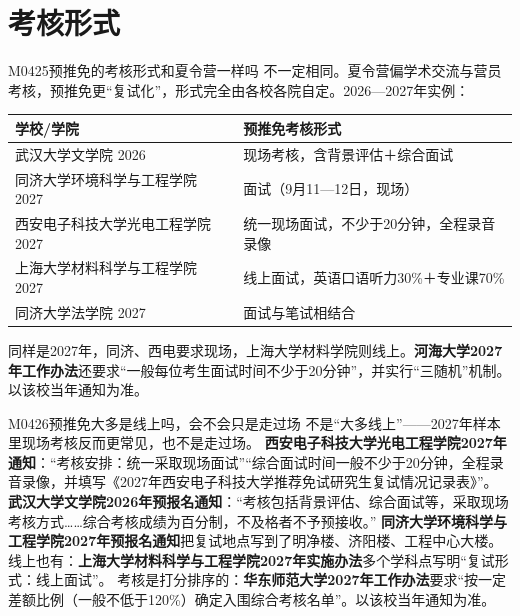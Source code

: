 \section{考核形式}
\begin{qa}{M0425}{预推免的考核形式和夏令营一样吗}
不一定相同。夏令营偏学术交流与营员考核，预推免更“复试化”，形式完全由各校各院自定。2026—2027年实例：
\par\vspace{2pt}\nobreak\begin{center}\footnotesize
\begin{tabularx}{\textwidth}{>{\raggedright\arraybackslash}X>{\raggedright\arraybackslash}X}
\toprule
\textbf{学校/学院} & \textbf{预推免考核形式} \\ \midrule
武汉大学文学院 2026 & 现场考核，含背景评估＋综合面试 \\
同济大学环境科学与工程学院 2027 & 面试（9月11—12日，现场） \\
西安电子科技大学光电工程学院 2027 & 统一现场面试，不少于20分钟，全程录音录像 \\
上海大学材料科学与工程学院 2027 & 线上面试，英语口语听力30\%＋专业课70\% \\
同济大学法学院 2027 & 面试与笔试相结合 \\
\bottomrule
\end{tabularx}
\end{center}\vspace{2pt}\par
同样是2027年，同济、西电要求现场，上海大学材料学院则线上。\textbf{河海大学2027年工作办法}还要求“一般每位考生面试时间不少于20分钟”，并实行“三随机”机制。以该校当年通知为准。
\end{qa}

\begin{qa}{M0426}{预推免大多是线上吗，会不会只是走过场}
不是“大多线上”——2027年样本里现场考核反而更常见，也不是走过场。
\textbf{西安电子科技大学光电工程学院2027年通知}：“考核安排：统一采取现场面试”“综合面试时间一般不少于20分钟，全程录音录像，并填写《2027年西安电子科技大学推荐免试研究生复试情况记录表》”。
\textbf{武汉大学文学院2026年预报名通知}：“考核包括背景评估、综合面试等，采取现场考核方式……综合考核成绩为百分制，不及格者不予预接收。”
\textbf{同济大学环境科学与工程学院2027年预报名通知}把复试地点写到了明净楼、济阳楼、工程中心大楼。
线上也有：\textbf{上海大学材料科学与工程学院2027年实施办法}多个学科点写明“复试形式：线上面试”。
考核是打分排序的：\textbf{华东师范大学2027年工作办法}要求“按一定差额比例（一般不低于120\%）确定入围综合考核名单”。以该校当年通知为准。
\end{qa}

